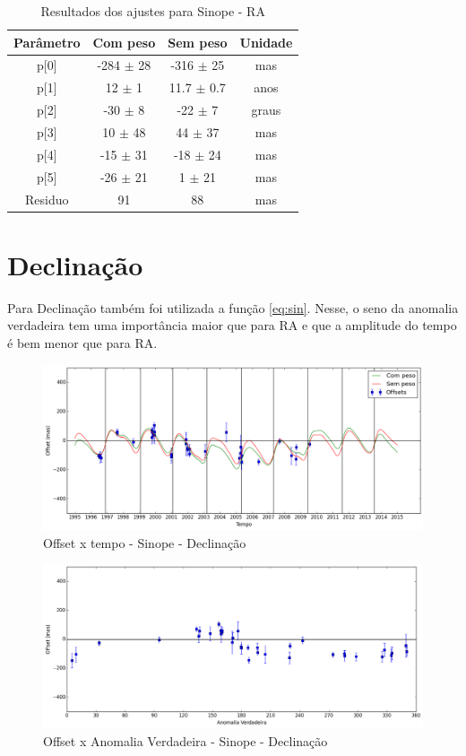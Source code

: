 \documentclass[11pt,a4paper]{report}
\begin{document}
\begin{table}[h!]
\caption{\label{Tab: Sinope-RA} Resultados dos ajustes para Sinope - RA}
\begin{centering}
\begin{tabular}{cccc}
\hline
\hline
Parâmetro & Com peso & Sem peso & Unidade\tabularnewline
\hline
p[0] & -284 $\pm$ 28 & -316 $\pm$ 25 & mas\\
p[1] & 12 $\pm$ 1 & 11.7 $\pm$ 0.7 & anos\\
p[2] & -30 $\pm$ 8 & -22 $\pm$ 7 & graus\\
p[3] & 10 $\pm$ 48 & 44 $\pm$ 37 & mas\\
p[4] & -15 $\pm$ 31 & -18 $\pm$ 24 & mas\\
p[5] & -26 $\pm$ 21 & 1 $\pm$ 21 & mas\\
Residuo & 91 & 88 & mas\\
\hline 
\end{tabular} 
\par\end{centering}
\end{table}

\section*{Declinação}

\indent \indent Para Declinação também foi utilizada a função \ref{eq:sin}. Nesse, o seno da anomalia verdadeira tem uma importância maior que para RA e que a amplitude do tempo é bem menor que para RA.

\begin{figure}[h]
\caption{Offset x tempo - Sinope - Declinação}
\includegraphics[scale=0.45]{Sinope/DEC.png} 
\end{figure}

\begin{figure}[h]
\caption{Offset x Anomalia Verdadeira - Sinope - Declinação}
\includegraphics[scale=0.45]{Sinope/DEC_anom.png}  
\end{figure}
\end{document}
